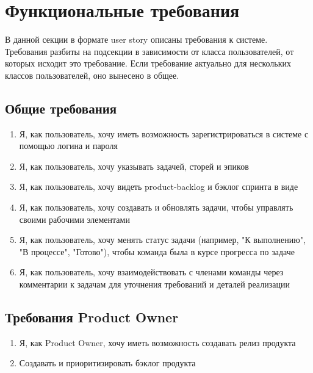 \documentclass{article}
\begin{document}
\section{Функциональные требования}

В данной секции в формате user story описаны требования к системе.
Требования разбиты на подсекции в зависимости от класса пользователей,
от которых исходит это требование.
Если требование актуально для нескольких классов пользователей, оно
вынесено в общее.

\subsection{Общие требования}
\begin{enumerate}[label=\textbf{FR\arabic*}.]
  \item Я, как пользователь, хочу иметь возможность зарегистрироваться в системе с помощью логина и пароля
  \item Я, как пользователь, хочу указывать  задачей, сторей и эпиков
  \item Я, как пользователь, хочу видеть \Gls{product-backlog} и бэклог спринта в виде 
  \item Я, как пользователь, хочу создавать и обновлять задачи, чтобы управлять своими рабочими элементами
  \item Я, как пользователь, хочу менять статус задачи (например, "К выполнению", "В процессе", "Готово"), чтобы команда была в курсе прогресса по задаче
  \item Я, как пользователь, хочу взаимодействовать с членами команды через комментарии к задачам для уточнения требований и деталей реализации
\end{enumerate}

\subsection{Требования Product Owner}
\begin{enumerate}[label=\textbf{POR\arabic*}.]
  \item Я, как Product Owner, хочу иметь возможность создавать релиз продукта
  \item Создавать и приоритизировать бэклог продукта
\end{enumerate}
\end{document}
